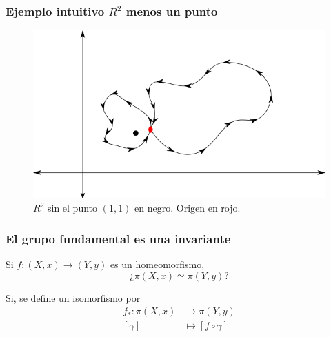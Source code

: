 \documentclass[xetex,mathserif,serif]{beamer}
\begin{document}
  \begin{frame}
    \frametitle{Ejemplo intuitivo \(R^2\) menos un punto}
    \begin{figure}[h]
      \centering
      \includegraphics[scale=0.5]{../tesis/imagenes/R2-punto.png}
      \caption{\(R^2\) sin el punto \((1,1)\) en negro. Origen en rojo. }
    \end{figure}

  \end{frame}

  \begin{frame}
    \frametitle{El grupo fundamental es una invariante}
    Si \(f : (X, x) \to (Y, y) \) es un homeomorfismo, \[¿\pi (X, x)
    \simeq \pi (Y,y)?\]

    \pause

    Si, se define un isomorfismo por
    \begin{align*}
      f_* : \pi (X,x) &\to \pi (Y, y) \\
      [\gamma] &\longmapsto [ f \circ \gamma ]
    \end{align*}
  \end{frame}
\end{document}
